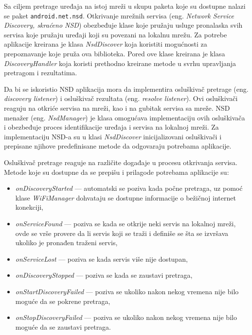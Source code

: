 \documentclass[struktura.tex]{subfiles}
\begin{document}
Sa ciljem pretrage uređaja na istoj mreži u skupu paketa koje su dostupne nalazi se paket  \verb|android.net.nsd|. Otkrivanje mrežnih servisa (eng. \textit{Network Service Discovery, skraćeno NSD}) \cite{sajt:nsd} obezbeđuje klase koje pružaju usluge pronalaska svih servisa koje pružaju uređaji koji su povezani na lokalnu mrežu. Za potrebe aplikacije kreirana je klasa \textit{NsdDiscover} koja koristiti mogućnosti za prepoznavanje koje pruža ova biblioteka. Pored ove klase kreirana je klasa \textit{DiscoveryHandler} koja koristi prethodno kreirane metode u svrhu upravljanja pretragom i rezultatima.

Da bi se iskoristio NSD aplikacija mora da implementira osluškivač pretrage (eng. \textit{discovery listener}) i osluškivač rezultata (eng. \textit{resolve listener}). Ovi osluškivači reaguju na otkriće servisa na mreži, kao i na gubitak servisa sa mreže. NSD menažer (eng. \textit{NsdManager}) je klasa omogućava implementaciju ovih osluškivača i obezbeđuje proces identifikacije uređaja i servisa na lokalnoj mreži. Za implementaciju NSD-a su u klasi \textit{NsdDiscover} inicijalizovani osluškivači i prepisane njihove predefinisane metode da odgovaraju potrebama aplikacije.

Osluškivač pretrage reaguje na različite događaje u procesu otkrivanja servisa. Metode koje su dostupne da se prepišu i prilagode potrebama aplikacije su:
\begin{itemize}
    \item \textit{onDiscoveryStarted} --- automatski se poziva kada počne pretraga, uz pomoć klase \textit{WiFiManager} dohvataju se dostupne informacije o bežičnoj internet konekciji,
    \item \textit{onServiceFound} --- poziva se kada se otkrije neki servis na lokalnoj mreži, ovde se vrše provere da li servis koji se traži i definiše se šta se izvršava ukoliko je pronađen traženi servis,
    \item \textit{onServiceLost} --- poziva se kada servis više nije dostupan,
    \item \textit{onDiscoveryStopped} --- poziva se kada se zaustavi pretraga, 
    \item \textit{onStartDiscoveryFailed} --- poziva se ukoliko nakon nekog vremena nije bilo moguće da se pokrene pretraga,
    \item \textit{onStopDiscoveryFailed} --- poziva se ukoliko nakon nekog vremena nije bilo moguće da se zaustavi pretraga.
\end{itemize}
\end{document}
